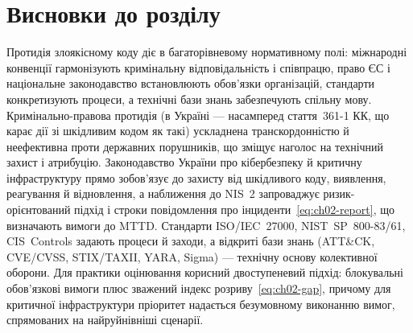 \section*{Висновки до розділу}

Протидія злоякісному коду діє в багаторівневому нормативному полі: міжнародні конвенції гармонізують кримінальну відповідальність і співпрацю, право ЄС і національне законодавство встановлюють обов'язки організацій, стандарти конкретизують процеси, а технічні бази знань забезпечують спільну мову. Кримінально-правова протидія (в Україні --- насамперед стаття~361-1 КК, що карає дії зі шкідливим кодом як такі) ускладнена транскордонністю й неефективна проти державних порушників, що зміщує наголос на технічний захист і атрибуцію. Законодавство України про кібербезпеку й критичну інфраструктуру прямо зобов'язує до захисту від шкідливого коду, виявлення, реагування й відновлення, а наближення до NIS~2 запроваджує ризик-орієнтований підхід і строки повідомлення про інциденти~\eqref{eq:ch02-report}, що визначають вимоги до MTTD. Стандарти ISO/IEC~27000, NIST~SP~800-83/61, CIS~Controls задають процеси й заходи, а відкриті бази знань (ATT\&CK, CVE/CVSS, STIX/TAXII, YARA, Sigma) --- технічну основу колективної оборони. Для практики оцінювання корисний двоступеневий підхід: блокувальні обов'язкові вимоги плюс зважений індекс розриву~\eqref{eq:ch02-gap}, причому для критичної інфраструктури пріоритет надається безумовному виконанню вимог, спрямованих на найруйнівніші сценарії.

